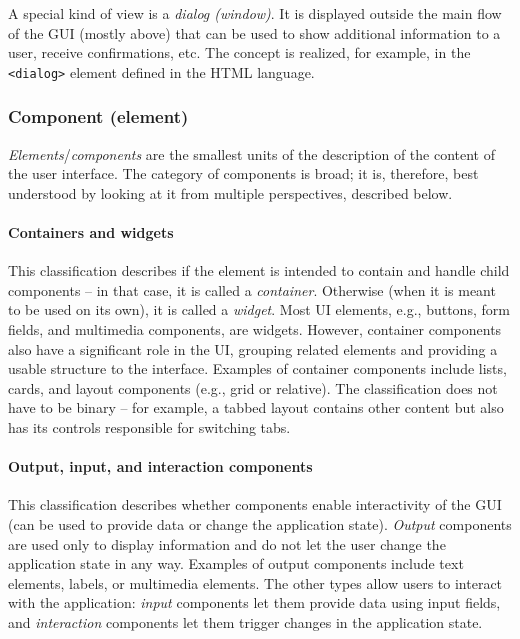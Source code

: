 A special kind of view is a \emph{dialog (window)}.
It is displayed outside the main flow of the GUI (mostly above) that can be used to show additional information to a user, receive confirmations, etc.
The concept is realized, for example, in the \texttt{<dialog>} element defined in the HTML language.

\subsubsection{Component (element)}
\emph{Elements}/\emph{components} are the smallest units of the description of the content of the user interface.
The category of components is broad;
it is, therefore, best understood by looking at it from multiple perspectives, described below.

\paragraph{Containers and widgets}
This classification describes if the element is intended to contain and handle child components -- in that case, it is called a \emph{container}.
Otherwise (when it is meant to be used on its own), it is called a \emph{widget}.
Most UI elements, e.g., buttons, form fields, and multimedia components, are widgets.
However, container components also have a significant role in the UI, grouping related elements and providing a usable structure to the interface.
Examples of container components include lists, cards, and layout components (e.g., grid or relative).
The classification does not have to be binary -- for example, a tabbed layout contains other content but also has its controls responsible for switching tabs.

\paragraph{Output, input, and interaction components}
This classification describes whether components enable interactivity of the GUI (can be used to provide data or change the application state).
\emph{Output} components are used only to display information and do not let the user change the application state in any way.
Examples of output components include text elements, labels, or multimedia elements.
The other types allow users to interact with the application: \emph{input} components let them provide data using input fields, and \emph{interaction} components let them trigger changes in the application state.

